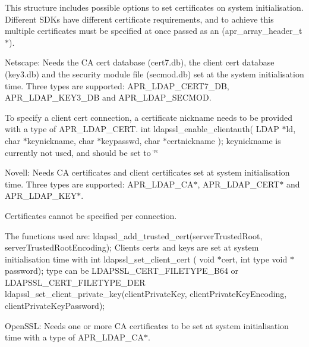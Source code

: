 This structure includes possible options to set certificates on system initialisation. Different S\-D\-Ks have different certificate requirements, and to achieve this multiple certificates must be specified at once passed as an (apr\-\_\-array\-\_\-header\-\_\-t $\ast$).

Netscape\-: Needs the C\-A cert database (cert7.\-db), the client cert database (key3.\-db) and the security module file (secmod.\-db) set at the system initialisation time. Three types are supported\-: A\-P\-R\-\_\-\-L\-D\-A\-P\-\_\-\-C\-E\-R\-T7\-\_\-\-D\-B, A\-P\-R\-\_\-\-L\-D\-A\-P\-\_\-\-K\-E\-Y3\-\_\-\-D\-B and A\-P\-R\-\_\-\-L\-D\-A\-P\-\_\-\-S\-E\-C\-M\-O\-D.

To specify a client cert connection, a certificate nickname needs to be provided with a type of A\-P\-R\-\_\-\-L\-D\-A\-P\-\_\-\-C\-E\-R\-T. int ldapssl\-\_\-enable\-\_\-clientauth( L\-D\-A\-P $\ast$ld, char $\ast$keynickname, char $\ast$keypasswd, char $\ast$certnickname ); keynickname is currently not used, and should be set to \char`\"{}\char`\"{}

Novell\-: Needs C\-A certificates and client certificates set at system initialisation time. Three types are supported\-: A\-P\-R\-\_\-\-L\-D\-A\-P\-\_\-\-C\-A$\ast$, A\-P\-R\-\_\-\-L\-D\-A\-P\-\_\-\-C\-E\-R\-T$\ast$ and A\-P\-R\-\_\-\-L\-D\-A\-P\-\_\-\-K\-E\-Y$\ast$.

Certificates cannot be specified per connection.

The functions used are\-: ldapssl\-\_\-add\-\_\-trusted\-\_\-cert(server\-Trusted\-Root, server\-Trusted\-Root\-Encoding); Clients certs and keys are set at system initialisation time with int ldapssl\-\_\-set\-\_\-client\-\_\-cert ( void $\ast$cert, int type void $\ast$password); type can be L\-D\-A\-P\-S\-S\-L\-\_\-\-C\-E\-R\-T\-\_\-\-F\-I\-L\-E\-T\-Y\-P\-E\-\_\-\-B64 or L\-D\-A\-P\-S\-S\-L\-\_\-\-C\-E\-R\-T\-\_\-\-F\-I\-L\-E\-T\-Y\-P\-E\-\_\-\-D\-E\-R ldapssl\-\_\-set\-\_\-client\-\_\-private\-\_\-key(client\-Private\-Key, client\-Private\-Key\-Encoding, client\-Private\-Key\-Password);

Open\-S\-S\-L\-: Needs one or more C\-A certificates to be set at system initialisation time with a type of A\-P\-R\-\_\-\-L\-D\-A\-P\-\_\-\-C\-A$\ast$.

